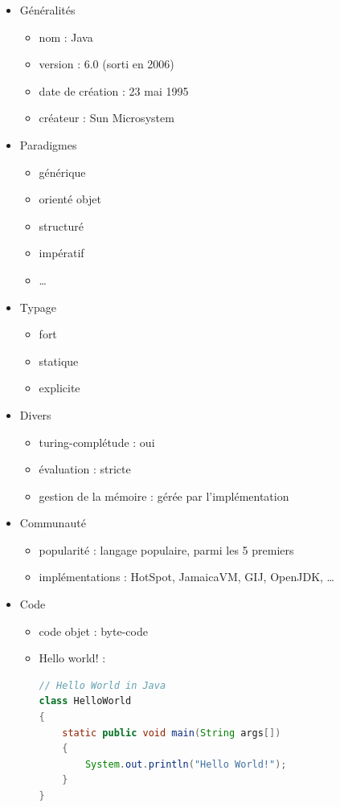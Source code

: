 \renewcommand{\labelitemi}{\textbullet}
\begin{itemize}
\item Généralités
	\begin{itemize}
	\item nom : Java
	\item version : 6.0 (sorti en 2006)
	\item date de création : 23 mai 1995
	\item créateur : Sun Microsystem\\
	\end{itemize}
\item Paradigmes
	\begin{itemize}
	\item générique
	\item orienté objet
	\item structuré
	\item impératif
	\item …\\
	\end{itemize}
\item Typage
	\begin{itemize}
	\item fort
	\item statique
	\item explicite\\
	\end{itemize}
\item Divers
	\begin{itemize}
	\item turing-complétude : oui
	\item évaluation : stricte
	\item gestion de la mémoire : gérée par l'implémentation\\
	\end{itemize}
\item Communauté
	\begin{itemize}
	\item popularité : langage populaire, parmi les 5 premiers
	\item implémentations : HotSpot, JamaicaVM, GIJ, OpenJDK, …\\
	\end{itemize}
\item Code
	\begin{itemize}
	\item code objet : byte-code
	\item Hello world! :
\begin{lstlisting}[language=java]
// Hello World in Java
class HelloWorld
{
    static public void main(String args[])
    {
        System.out.println("Hello World!");
    }
}
\end{lstlisting}
	\end{itemize}
\end{itemize}

